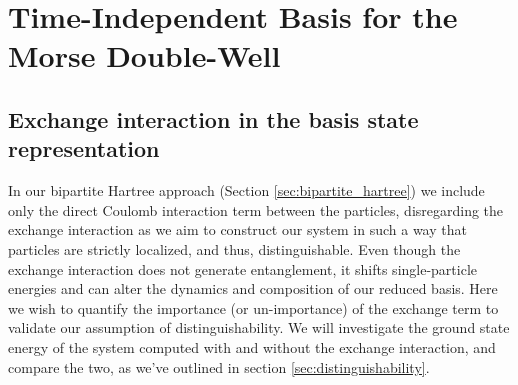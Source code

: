 \documentclass{subfiles}
\begin{document}
\section{Time-Independent Basis for the Morse Double-Well}\label{sec:time_independent_basis}


\subsection{Exchange interaction in the basis state representation}
In our bipartite Hartree approach (Section \ref{sec:bipartite_hartree}) we include only the direct Coulomb interaction term between the particles, disregarding the exchange interaction as we aim to construct our system in such a way that particles are strictly localized, and thus, distinguishable. Even though the exchange interaction does not generate entanglement, it shifts single-particle energies and can alter the dynamics and composition of our reduced basis. Here we wish to quantify the importance (or un-importance) of the exchange term to validate our assumption of distinguishability. We will investigate the ground state energy of the system computed with and without the exchange interaction, and compare the two, as we've outlined in section \ref{sec:distinguishability}. \\ 
\end{document}
